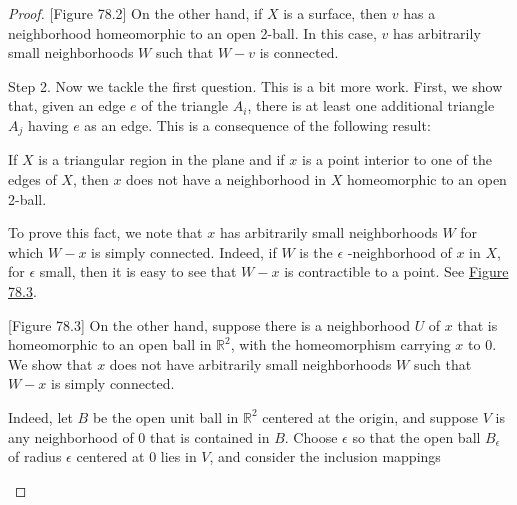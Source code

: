 \begin{proof}
[Figure 78.2]
On the other hand, if \(X\) is a surface, then \(v\) has a neighborhood homeomorphic to an open 2-ball. In this case, \(v\) has arbitrarily small neighborhoods \(W\) such that \(W - v\) is connected.

Step 2. Now we tackle the first question. This is a bit more work. First, we show that, given an edge \(e\) of the triangle \(A_{i}\), there is at least one additional triangle \(A_{j}\) having \(e\) as an edge. This is a consequence of the following result:

If \(X\) is a triangular region in the plane and if \(x\) is a point interior to one of the edges of \(X\), then \(x\) does not have a neighborhood in \(X\) homeomorphic to an open 2-ball.

To prove this fact, we note that \(x\) has arbitrarily small neighborhoods \(W\) for which \(W - x\) is simply connected. Indeed, if \(W\) is the \(\epsilon\) -neighborhood of \(x\) in \(X\), for \(\epsilon\) small, then it is easy to see that \(W - x\) is contractible to a point. See \hyperref[fig:78.3]{Figure 78.3}.

[Figure 78.3]
On the other hand, suppose there is a neighborhood \(U\) of \(x\) that is homeomorphic to an open ball in \(\mathbb{R}^{2}\), with the homeomorphism carrying \(x\) to 0. We show that \(x\) does not have arbitrarily small neighborhoods \(W\) such that \(W - x\) is simply connected.

Indeed, let \(B\) be the open unit ball in \(\mathbb{R}^{2}\) centered at the origin, and suppose \(V\) is any neighborhood of 0 that is contained in \(B\). Choose \(\epsilon\) so that the open ball \(B_{\epsilon }\) of radius \(\epsilon\) centered at 0 lies in \(V\), and consider the inclusion mappings

\par\nopagebreak
\begin{center}
	\label{fig:com_78_35}
\end{center}
\par\nopagebreak 


\end{proof}
